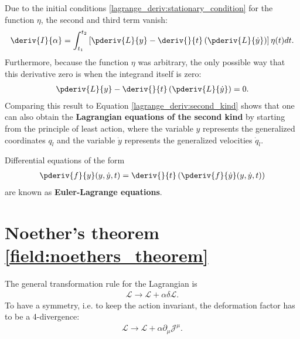     Due to the initial conditions \eqref{lagrange_deriv:stationary_condition} for the function $\eta$, the second and third term vanish:
    \begin{gather}
        \label{lagrange_deriv:final_integral}
        \deriv{I}{\alpha}=\int_{t_1}^{t_2}\left[\pderiv{L}{y} - \deriv{}{t}\left(\pderiv{L}{\dot{y}}\right)\right]\eta(t)dt.
    \end{gather}
    Furthermore, because the function $\eta$ was arbitrary, the only possible way that this derivative zero is when the integrand itself is zero:
    \begin{gather}
        \label{lagrange_deriv:second_kind_with_hamilton}
        \pderiv{L}{y} - \deriv{}{t}\left(\pderiv{L}{\dot{y}}\right) = 0.
    \end{gather}
    Comparing this result to Equation \eqref{lagrange_deriv:second_kind} shows that one can also obtain the \textbf{Lagrangian equations of the second kind} by starting from the principle of least action, where the variable $y$ represents the generalized coordinates $q_l$ and the variable $\dot{y}$ represents the generalized velocities $\dot{q}_l$.

    \begin{remark}
        Differential equations of the form
        \begin{gather}
            \label{lagrange_deriv:euler_lagrange_equation}
            \pderiv{f}{y}(y,\dot{y},t) = \deriv{}{t}\left(\pderiv{f}{\dot{y}}(y,\dot{y},t)\right)
        \end{gather}
        are known as \textbf{Euler-Lagrange equations}.
    \end{remark}

\section{Noether's theorem \ref{field:noethers_theorem}}\label{proof:noether}

    The general transformation rule for the Lagrangian is
    \begin{gather}
        \label{noether_deriv:1}
        \mathcal{L}\longrightarrow\mathcal{L} + \alpha\delta\mathcal{L}.
    \end{gather}
    To have a symmetry, i.e. to keep the action invariant, the deformation factor has to be a 4-divergence:
    \begin{gather}
        \label{noether_deriv:2}
        \mathcal{L}\longrightarrow\mathcal{L} + \alpha\partial_\mu\mathcal{J}^\mu.
    \end{gather}

